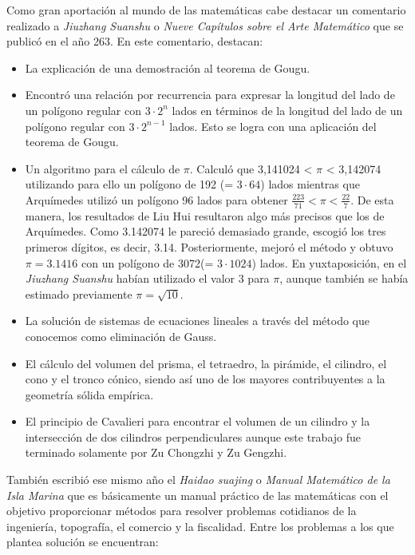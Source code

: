 \documentclass[a4paper, 11pt]{article}
\begin{document}
		Como gran aportación al mundo de las matemáticas cabe destacar un comentario realizado a \textit{Jiuzhang Suanshu}
		o \textit{Nueve Capítulos sobre el Arte Matemático} que se publicó en el año 263. En este comentario, destacan:
		
		\begin{itemize}
			\item La explicación de una demostración al teorema de Gougu.
			
			\item Encontró una relación por recurrencia para expresar la longitud del lado de un polígono regular con
			$3 \cdot 2^n$ lados en términos de la longitud del lado de un polígono regular con $3 \cdot 2^{n-1}$ lados.
			Esto se logra con una aplicación del teorema de Gougu.
			
			\item Un algoritmo para el cálculo de $\pi$. Calculó que 3,141024 < $\pi$ < 3,142074 utilizando para ello un
			polígono de 192 (= $3 \cdot 64$) lados mientras que Arquímedes utilizó un polígono 96 lados para obtener
			$\frac {223}{71} < \pi < \frac{22}{7}$. De esta manera, los resultados de Liu Hui resultaron algo más precisos
			que los de Arquímedes. Como 3.142074 le pareció demasiado grande, escogió los tres primeros dígitos, es decir,
			3.14. Posteriormente, mejoró el método y obtuvo $\pi = 3.1416$ con un polígono de 3072(= $3 \cdot 1024$) lados.
			En yuxtaposición, en el \textit{Jiuzhang Suanshu} habían utilizado el valor 3 para $\pi$, aunque también se
			había estimado previamente $\pi = \sqrt{10}$.
			
			\item La solución de sistemas de ecuaciones lineales a través del método que conocemos como eliminación de Gauss.
			
			\item El cálculo del volumen del prisma, el tetraedro, la pirámide, el cilindro, el cono y el tronco cónico,
			siendo así uno de los mayores contribuyentes a la geometría sólida empírica.
			
			\item El principio de Cavalieri para encontrar el volumen de un cilindro y la intersección de dos cilindros
			perpendiculares aunque este trabajo fue terminado solamente por  Zu Chongzhi y Zu Gengzhi.
		\end{itemize}

		También escribió ese mismo año el \textit{Haidao suajing} o \textit{Manual Matemático de la Isla Marina} que es
		básicamente un manual práctico de las matemáticas con el objetivo proporcionar métodos para resolver problemas
		cotidianos de la ingeniería, topografía, el comercio y la fiscalidad. Entre los problemas a los que plantea
		solución se encuentran:
		
\end{document}
